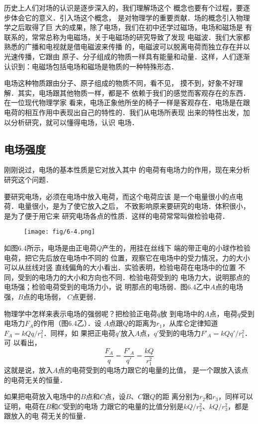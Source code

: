 历史上人们对场的认识是逐步深入的，我们理解场这个
概念也要有个过程，要逐步体会它的意义．引入场这个概念，
是对物理学的重要贡献．场的概念引入物理学之后取得了巨
大的成果，除了电场，我们在初中还学过磁场，电场和磁场是
有联系的，常常总称为电磁场，关于电磁场的研究导致了发现
电磁波．我们大家都熟悉的广播和电视就是借电磁波来传播
的，电磁波可以脱离电荷而独立存在并以光速传播，它跟由
原子、分子组成的物质一样具有能量和动量．这样，人们逐渐
认识到：电磁场包括电场和磁场是物质的一种特殊形态．

电场这种物质跟由分子、原子组成的物质不同，看不见，
摸不到，好象不好理解．其实，电场跟其他物质一样，都是不
依赖于我们的感觉而客观存在的东西．在一位现代物理学家
看来，电场正象他所坐的椅子一样是客观存在．电场是在跟
电荷的相互作用中表现出自己的特性的．我们从电场所表现
出来的特性出发，加以分析研究，就可以懂得电场，认识
电场．

\subsection{电场强度} 

刚刚说过，电场的基本性质是它对放入其中
的电荷有电场力的作用，现在来分析研究这个问题．

要研究电场，必须在电场中放入电荷，而这个电荷应该
是一个电量很小的点电荷．电量很小，是为了使它放入之后，
不致影响原来要研究的电场．体积很小，是为了便于用它来
研究电场各点的性质．这样的电荷常常叫做检验电荷．
\begin{figure}[htp]\centering
	\texttt{[image: fig/6-4.png]}
	\caption{}
	\end{figure}

如图6.4所示，电场是由正电荷$Q$产生的，用挂在丝线下
端的带正电的小球作检验电荷，把它先后放在电场中不同的
位置，观察它在电场中的受力情况，力的大小可以从丝线对竖
直线偏角的大小看出．实验表明，检验电荷在电场中的位置
不同，受到的电场力的大小和方向也不同．检验电荷受到的
电场力大，说明那点的电场强；检验电荷受到的电场力小，说
明那点的电场弱．图6.4乙中$A$点的电场强，$B$点的电场弱，
$C$点更弱．

物理学中怎样来表示电场的强弱呢？把检验正电荷$q$放
到电场中的$A$点，电荷$q$受到电场力$F_A$的作用（图6.4乙）．设
$A$点跟$Q$的距离为$r_1$，从库仑定律知道$F_A=kQq/r^2_1$．同样，如
果把正电荷$q'$放入$A$点，$q'$受到的电场力$F'_A=kQq'/r_1^2$．可
以看出，
\[\frac{F_A}{q}=\frac{F'_A}{q'}=\frac{kQ}{r^2_1} \]
这就是说，放入$A$点的电荷受到的电场力跟它的电量的比值，
是一个跟放入该点的电荷无关的恒量．

如果把电荷放入电场中的$B$点和$C$点，设$B$、$C$跟$Q$的距
离分别为$r_2$和$r_3$，同样可以证明，电荷在$B$和$C$受到的电场
力跟它的电量的比值分别是$kQ/r^2_2$、$kQ/r_3^2$，都是跟放入的电
荷无关的恒量．

